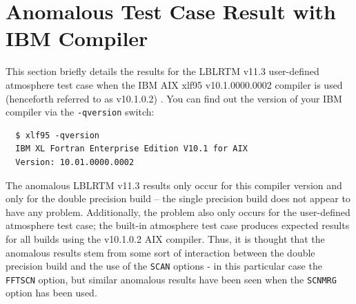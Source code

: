 \section{Anomalous Test Case Result with IBM Compiler}
\label{apdx:busted_ibm_compiler_results}
This section briefly details the results for the LBLRTM v11.3 user-defined atmosphere test case when the IBM AIX xlf95 v10.1.0000.0002 compiler is used (henceforth referred to as v10.1.0.2) . You can find out the version of your IBM compiler via the \texttt{-qversion} switch:
\begin{verbatim}
  $ xlf95 -qversion
  IBM XL Fortran Enterprise Edition V10.1 for AIX
  Version: 10.01.0000.0002\end{verbatim}

The anomalous LBLRTM v11.3 results only occur for this compiler version and only for the double precision build -- the single precision build does not appear to have any problem. Additionally, the problem also only occurs for the user-defined atmosphere test case; the built-in atmosphere test case produces expected results for all builds using the v10.1.0.2 AIX compiler. Thus, it is thought that the anomalous results stem from some sort of interaction between the double precision build and the use of the \texttt{SCAN} options - in this particular case the \texttt{FFTSCN} option, but similar anomalous results have been seen when the \texttt{SCNMRG} option has been used.
 
